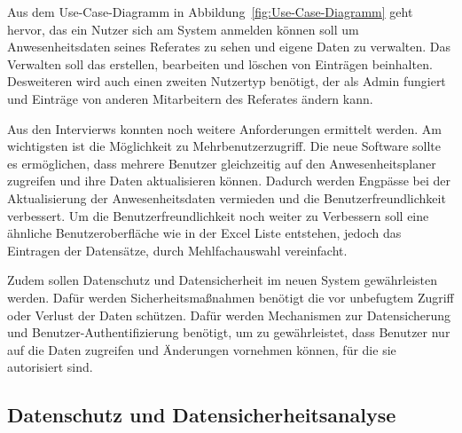 Aus dem Use-Case-Diagramm in Abbildung~\ref{fig:Use-Case-Diagramm} geht hervor, das ein Nutzer sich am System anmelden können soll um Anwesenheitsdaten seines Referates zu sehen und eigene Daten zu verwalten. Das Verwalten soll das erstellen, bearbeiten und löschen von Einträgen beinhalten. Desweiteren wird auch einen zweiten Nutzertyp benötigt, der als Admin fungiert und Einträge von anderen Mitarbeitern des Referates ändern kann.

Aus den Intervierws konnten noch weitere Anforderungen ermittelt werden. Am wichtigsten ist die Möglichkeit zu Mehrbenutzerzugriff. Die neue Software sollte es ermöglichen, dass mehrere Benutzer gleichzeitig auf den Anwesenheitsplaner zugreifen und ihre Daten aktualisieren können. Dadurch werden Engpässe bei der Aktualisierung der Anwesenheitsdaten vermieden und die Benutzerfreundlichkeit verbessert. Um die Benutzerfreundlichkeit noch weiter zu Verbessern soll eine ähnliche Benutzeroberfläche wie in der Excel Liste entstehen, jedoch das Eintragen der Datensätze, durch \zB Mehlfachauswahl vereinfacht.

Zudem sollen Datenschutz und Datensicherheit im neuen System gewährleisten werden. Dafür werden Sicherheitsmaßnahmen benötigt die vor unbefugtem Zugriff oder Verlust der Daten schützen. Dafür werden Mechanismen zur Datensicherung und Benutzer-Authentifizierung benötigt, um zu gewährleistet, dass Benutzer nur auf die Daten zugreifen und Änderungen vornehmen können, für die sie autorisiert sind.

\subsection{ Datenschutz und Datensicherheitsanalyse}
\label{sec:Datenschutz}
